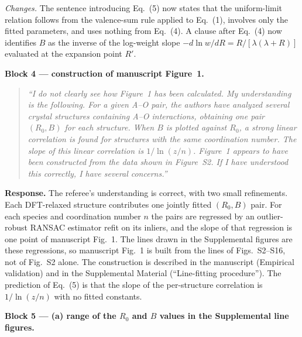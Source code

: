 \documentclass[11pt]{article}
\newenvironment{refquote}%
  {\begin{quote}\itshape\color{black!70}}%
  {\end{quote}}
\begin{document}
\emph{Changes.}  The sentence introducing Eq.~(5) now states that
the uniform-limit relation follows from the valence-sum rule applied
to Eq.~(1), involves only the fitted parameters, and uses nothing
from Eq.~(4).  A clause after Eq.~(4) now identifies $B$ as the
inverse of the log-weight slope $-d\ln w/dR=R/[\lambda(\lambda+R)]$
evaluated at the expansion point $R'$.

\textbf{Block 4 --- construction of manuscript Figure~1.}

\begin{refquote}
``I do not clearly see how Figure~1 has been calculated.  My
understanding is the following.  For a given A--O pair, the authors
have analyzed several crystal structures containing A--O
interactions, obtaining one pair $(R_0,B)$ for each structure.  When
$B$ is plotted against $R_0$, a strong linear correlation is found for
structures with the same coordination number.  The slope of this
linear correlation is $1/\ln(z/n)$.  Figure~1 appears to have been
constructed from the data shown in Figure~S2.  If I have understood
this correctly, I have several concerns.''
\end{refquote}

\textbf{Response.}  The referee's understanding is correct, with two
small refinements.  Each DFT-relaxed structure contributes one
jointly fitted $(R_0,B)$ pair.  For each species and coordination
number $n$ the pairs are regressed by an outlier-robust RANSAC
estimator refit on its inliers, and the slope of that regression is
one point of manuscript Fig.~1.  The lines drawn in the Supplemental figures are
these regressions, so manuscript Fig.~1 is built from the lines of
Figs.~S2--S16, not of Fig.~S2 alone.  The construction is described
in the manuscript (Empirical validation) and in the Supplemental
Material (``Line-fitting procedure'').  The prediction of Eq.~(5) is
that the slope of the per-structure correlation is $1/\ln(z/n)$ with
no fitted constants.

\textbf{Block 5 --- (a) range of the $R_0$ and $B$ values in the
Supplemental line figures.}
\end{document}
